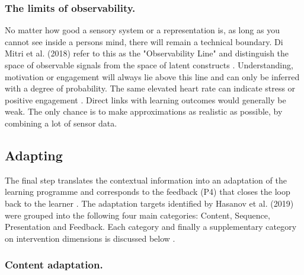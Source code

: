 \documentclass[runningheads]{llncs}
\begin{document}
\subsubsection{The limits of observability.}
No matter how good a sensory system or a representation is, as long as you cannot see inside a persons mind, there will remain a technical boundary. Di Mitri et al. (2018)
refer to this as the "Observability Line" and distinguish the space of observable
signals from the space of latent constructs \cite{di_mitri_signals_2018}.
Understanding, motivation or engagement will always lie above this line and can only be
inferred with a degree of probability. The same elevated heart rate can indicate stress or
positive engagement \cite{hong_advances_2025}. Direct links with learning outcomes would generally be weak. The only chance is to make approximations as realistic as possible, by combining a lot of sensor data.

\subsection{Adapting}

The final step translates the contextual information into an adaptation of the
learning programme and corresponds to the feedback (P4) that closes the loop back to the learner \cite{di_mitri_signals_2018}.
The adaptation targets identified by Hasanov et al. (2019) were grouped into the following four main categories: Content, Sequence, Presentation and Feedback. Each category and finally a supplementary category on intervention dimensions is discussed below \cite{hasanov_survey_2019}.


\subsubsection{Content adaptation.}
\end{document}
